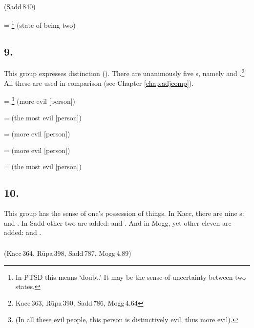 \subparagraph*{} (Sadd\,840)\label{pacct8:dlhaka}

 = \footnote{ In PTSD this means `doubt.' It may be the sense of uncertainty between two states.} (state of being two) \par

\subsection*{9.\ }\label{tadgroup9}\label{par:visesataddhita}\label{pacct9:tara}\label{pacct9:tama}\label{pacct9:isika}\label{pacct9:issika}\label{pacct9:iya}\label{pacct9:idtdtha}

This group expresses distinction (). There are unanimously five s, namely  and .\footnote{Kacc\,363, R\=upa\,390, Sadd\,786, Mogg\,4.64} All these are used in comparison (see Chapter \ref{chap:adjcomp}).

 = \footnote{ (In all these evil people, this person is distinctively evil, thus more evil).} (more evil [person]) \par
{} =  (the most evil [person]) \par
{} =  (more evil [person]) \par
{} =  (more evil [person]) \par
{} =  (the most evil [person]) \par

\subsection*{10.\ }\label{tadgroup10}

This group has the sense of one's possession of things. In Kacc, there are nine s:  and . In Sadd other two are added:  and . And in Mogg, yet other eleven are added:  and .

\subparagraph*{} (Kacc\,364, R\=upa\,398, Sadd\,787, Mogg\,4.89)\label{pacct10:vii}

